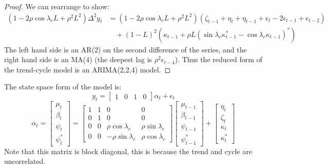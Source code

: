 \documentclass[DIV=14,titlepage=false]{scrreprt}
\begin{document}
\begin{proof}
    We can rearrange to show:
    \begin{align*}
        (1-2\rho \cos \lambda_c L + \rho^2L^2)\Delta^2 y_t &= (1-2\rho \cos \lambda_c L + \rho^2L^2)(\zeta_{t-1} + \eta_t + \eta_{t-1} + \epsilon_t - 2\epsilon_{t-1} + \epsilon_{t-2}) \\
        & \quad + (1-L)^2(\kappa_{t-1} +\rho L (\sin \lambda_c \kappa_{t-1}^* - \cos \lambda_c \kappa_{t-1})^*)
    \end{align*}
    The left hand side is an AR(2) on the second difference of the series, and the right hand side is an MA(4) (the deepest lag is $\rho^2 \epsilon_{t-4}$). Thus the reduced form of the trend-cycle model is an ARIMA(2,2,4) model.
\end{proof}
The state space form of the model is:
\[
    y_t = \begin{bmatrix} 1 & 0 & 1 & 0 \end{bmatrix} \alpha_t + \epsilon_t
    \]
\[
    \alpha_t = \begin{bmatrix} \mu_t \\ \beta_t \\ \psi_t \\ \psi_t^* \end{bmatrix} = \begin{bmatrix} 1 & 1 & 0 & 0 \\ 0 & 1 & 0 & 0 \\ 0 & 0 & \rho \cos \lambda_c & \rho \sin \lambda_c \\ 0 & 0 & -\rho \sin \lambda_c & \rho \cos \lambda_c \end{bmatrix} \begin{bmatrix} \mu_{t-1} \\ \beta_{t-1} \\ \psi_{t-1} \\ \psi_{t-1}^* \end{bmatrix} + \begin{bmatrix} \eta_t \\ \zeta_t \\ \kappa_t \\ \kappa_t^* \end{bmatrix}
\]
Note that this matrix is block diagonal, this is because the trend and cycle are uncorrelated.
\end{document}
